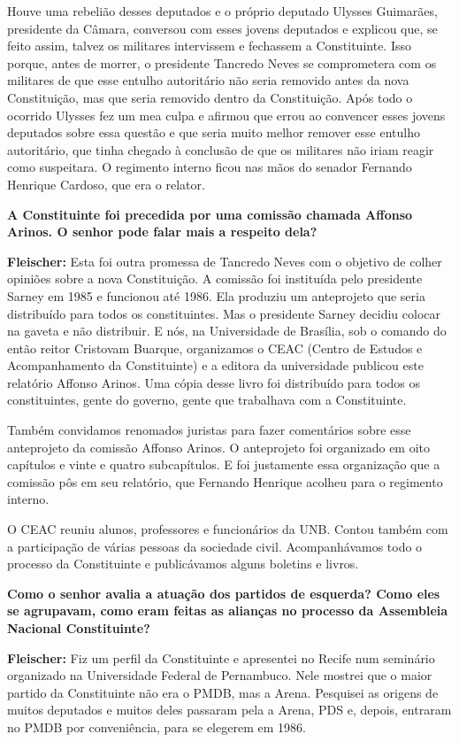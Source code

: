Houve uma rebelião desses deputados e o próprio deputado Ulysses
Guimarães, presidente da Câmara, conversou com esses jovens deputados e
explicou que, se feito assim, talvez os militares intervissem e
fechassem a Constituinte. Isso porque, antes de morrer, o presidente
Tancredo Neves se comprometera com os militares de que esse entulho
autoritário não seria removido antes da nova Constituição, mas que seria
removido dentro da Constituição. Após todo o ocorrido Ulysses fez um mea
culpa e afirmou que errou ao convencer esses jovens deputados sobre essa
questão e que seria muito melhor remover esse entulho autoritário, que
tinha chegado à conclusão de que os militares não iriam reagir como
suspeitara. O regimento interno ficou nas mãos do senador Fernando
Henrique Cardoso, que era o relator.

\textbf{A Constituinte foi precedida por uma comissão chamada Affonso
Arinos. O senhor pode falar mais a respeito dela?}

\textbf{Fleischer:} Esta foi outra promessa de Tancredo Neves com o
objetivo de colher opiniões sobre a nova Constituição. A comissão foi
instituída pelo presidente Sarney em 1985 e funcionou até 1986. Ela
produziu um anteprojeto que seria distribuído para todos os
constituintes. Mas o presidente Sarney decidiu colocar na gaveta e não
distribuir. E nós, na Universidade de Brasília, sob o comando do então
reitor Cristovam Buarque, organizamos o CEAC (Centro de Estudos e
Acompanhamento da Constituinte) e a editora da universidade publicou
este relatório Affonso Arinos. Uma cópia desse livro foi distribuído
para todos os constituintes, gente do governo, gente que trabalhava com
a Constituinte.

Também convidamos renomados juristas para fazer comentários sobre esse
anteprojeto da comissão Affonso Arinos. O anteprojeto foi organizado em
oito capítulos e vinte e quatro subcapítulos. E foi justamente essa
organização que a comissão pôs em seu relatório, que Fernando Henrique
acolheu para o regimento interno.

O CEAC reuniu alunos, professores e funcionários da UNB. Contou também
com a participação de várias pessoas da sociedade civil. Acompanhávamos
todo o processo da Constituinte e publicávamos alguns boletins e livros.

\textbf{Como o senhor avalia a atuação dos partidos de esquerda? Como
eles se agrupavam, como eram feitas as alianças no processo da
Assembleia Nacional Constituinte?}

\textbf{Fleischer:} Fiz um perfil da Constituinte e apresentei no Recife
num seminário organizado na Universidade Federal de Pernambuco. Nele
mostrei que o maior partido da Constituinte não era o PMDB, mas a Arena.
Pesquisei as origens de muitos deputados e muitos deles passaram pela a
Arena, PDS e, depois, entraram no PMDB por conveniência, para se
elegerem em 1986.

